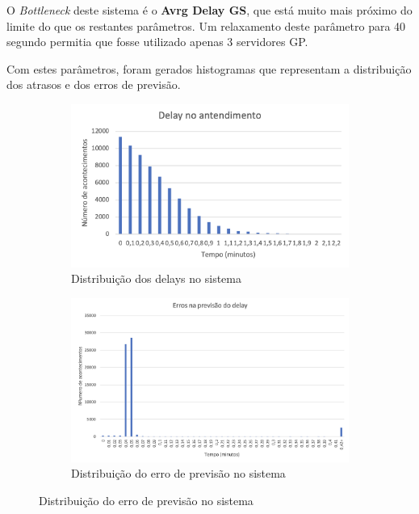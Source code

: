 O \textit{Bottleneck} deste sistema é o \textbf{Avrg Delay GS}, que está muito mais próximo do limite do que os restantes parâmetros.
Um relaxamento deste parâmetro para 40 segundo permitia que fosse utilizado apenas 3 servidores GP.

Com estes parâmetros, foram gerados histogramas que representam a distribuição dos atrasos e dos erros de previsão.

\begin{figure}[H]
    \centering
    \begin{subfigure}[b]{0.49\textwidth}
        \centering
    \includegraphics[width=\linewidth]{figs/intro/histo_delay.png}
    \caption{Distribuição dos delays no sistema}
    \label{fig:histo_delay}
    \end{subfigure}
    \hfill
    \begin{subfigure}[b]{0.5\textwidth}
        \centering
    \includegraphics[width=\linewidth]{figs/intro/histo_erro.png}
    \caption{Distribuição do erro de previsão no sistema}
    \label{fig:histo_erro}
    \end{subfigure}
       \label{fig:histogramas}
\end{figure}


